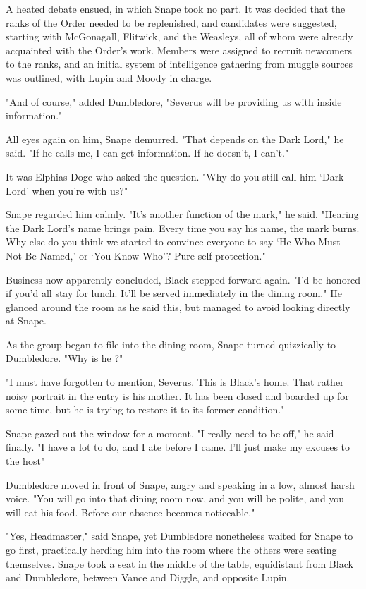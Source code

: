 A heated debate ensued, in which Snape took no part. It was decided that the ranks of the Order needed to be replenished, and candidates were suggested, starting with McGonagall, Flitwick, and the Weasleys, all of whom were already acquainted with the Order's work. Members were assigned to recruit newcomers to the ranks, and an initial system of intelligence gathering from muggle sources was outlined, with Lupin and Moody in charge.

"And of course," added Dumbledore, "Severus will be providing us with inside information."

All eyes again on him, Snape demurred. "That depends on the Dark Lord," he said. "If he calls me, I can get information. If he doesn't, I can't."

It was Elphias Doge who asked the question. "Why do you still call him `Dark Lord' when you're with us?"

Snape regarded him calmly. "It's another function of the mark," he said. "Hearing the Dark Lord's name brings pain. Every time you say his name, the mark burns. Why else do you think we started to convince everyone to say `He-Who-Must-Not-Be-Named,' or `You-Know-Who'? Pure self protection."

Business now apparently concluded, Black stepped forward again. "I'd be honored if you'd all stay for lunch. It'll be served immediately in the dining room." He glanced around the room as he said this, but managed to avoid looking directly at Snape.

As the group began to file into the dining room, Snape turned quizzically to Dumbledore. "Why is he{\el} ?"

"I must have forgotten to mention, Severus. This is Black's home. That rather noisy portrait in the entry is his mother. It has been closed and boarded up for some time, but he is trying to restore it to its former condition."

Snape gazed out the window for a moment. "I really need to be off," he said finally. "I have a lot to do, and I ate before I came. I'll just make my excuses to the host{\el}"

Dumbledore moved in front of Snape, angry and speaking in a low, almost harsh voice. "You will go into that dining room now, and you will be polite, and you will eat his food. Before our absence becomes noticeable."

"Yes, Headmaster," said Snape, yet Dumbledore nonetheless waited for Snape to go first, practically herding him into the room where the others were seating themselves. Snape took a seat in the middle of the table, equidistant from Black and Dumbledore, between Vance and Diggle, and opposite Lupin.

